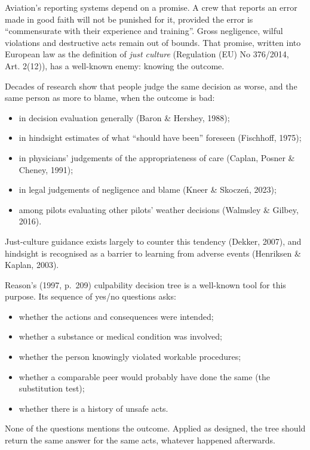 \documentclass[11pt]{article}
\providecommand{\tightlist}{\setlength{\itemsep}{0pt}\setlength{\parskip}{0pt}}
\begin{document}
Aviation's reporting systems depend on a promise. A crew that reports an error made in good faith will not be punished for it, provided the error is ``commensurate with their experience and training''. Gross negligence, wilful violations and destructive acts remain out of bounds. That promise, written into European law as the definition of \emph{just culture} (Regulation (EU) No 376/2014, Art. 2(12)), has a well-known enemy: knowing the outcome.

Decades of research show that people judge the same decision as worse, and the same person as more to blame, when the outcome is bad:

\begin{itemize}
\tightlist
\item
  in decision evaluation generally (Baron \& Hershey, 1988);
\item
  in hindsight estimates of what ``should have been'' foreseen (Fischhoff, 1975);
\item
  in physicians' judgements of the appropriateness of care (Caplan, Posner \& Cheney, 1991);
\item
  in legal judgements of negligence and blame (Kneer \& Skoczeń, 2023);
\item
  among pilots evaluating other pilots' weather decisions (Walmsley \& Gilbey, 2016).
\end{itemize}

Just-culture guidance exists largely to counter this tendency (Dekker, 2007), and hindsight is recognised as a barrier to learning from adverse events (Henriksen \& Kaplan, 2003).

Reason's (1997, p.~209) culpability decision tree is a well-known tool for this purpose. Its sequence of yes/no questions asks:

\begin{itemize}
\tightlist
\item
  whether the actions and consequences were intended;
\item
  whether a substance or medical condition was involved;
\item
  whether the person knowingly violated workable procedures;
\item
  whether a comparable peer would probably have done the same (the substitution test);
\item
  whether there is a history of unsafe acts.
\end{itemize}

None of the questions mentions the outcome. Applied as designed, the tree should return the same answer for the same acts, whatever happened afterwards.
\end{document}
